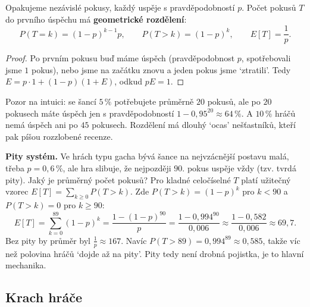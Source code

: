 \begin{definitionbox}
  Opakujeme nezávislé pokusy, každý uspěje s pravděpodobností $p$. Počet pokusů $T$ do prvního úspěchu má \textbf{geometrické rozdělení}:
  \begin{equation*}
    P(T = k) = (1 - p)^{k-1}p,\qquad P(T > k) = (1 - p)^k,\qquad E[T] = \frac{1}{p}.
  \end{equation*}
\end{definitionbox}

\begin{proof}
  Po prvním pokusu buď máme úspěch (pravděpodobnost $p$, spotřebovali jsme $1$ pokus), nebo jsme na začátku znovu a jeden pokus jsme `ztratili'. Tedy $E = p\cdot 1 + (1 - p)(1 + E)$, odkud $pE = 1$.
\end{proof}

Pozor na intuici: se šancí $5\,\%$ potřebujete průměrně $20$ pokusů, ale po $20$ pokusech máte úspěch jen s pravděpodobností $1 - 0{,}95^{20}\approx 64\,\%$. A $10\,\%$ hráčů nemá úspěch ani po $45$ pokusech. Rozdělení má dlouhý `ocas' nešťastníků, kteří pak píšou rozzlobené recenze.

\begin{example}
  \textbf{Pity systém.} Ve hrách typu gacha bývá šance na nejvzácnější postavu malá, třeba $p = 0{,}6\,\%$, ale hra slibuje, že nejpozději $90$. pokus uspěje vždy (tzv. tvrdá pity). Jaký je průměrný počet pokusů? Pro kladné celočíselné $T$ platí užitečný vzorec $E[T] = \sum_{k\geq 0}P(T > k)$. Zde $P(T > k) = (1 - p)^k$ pro $k < 90$ a $P(T > k) = 0$ pro $k\geq 90$:
  \begin{equation*}
    E[T] = \sum_{k=0}^{89}(1 - p)^k = \frac{1 - (1 - p)^{90}}{p} = \frac{1 - 0{,}994^{90}}{0{,}006}\approx\frac{1 - 0{,}582}{0{,}006}\approx 69{,}7.
  \end{equation*}
  Bez pity by průměr byl $\frac{1}{p}\approx 167$. Navíc $P(T > 89) = 0{,}994^{89}\approx 0{,}585$, takže víc než polovina hráčů `dojde až na pity'. Pity tedy není drobná pojistka, je to hlavní mechanika.
\end{example}

\subsection{Krach hráče}

